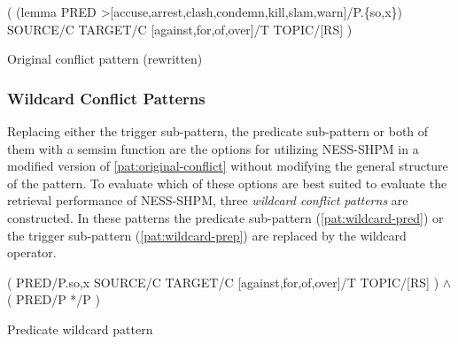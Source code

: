 \documentclass[11pt]{scrreprt}
\begin{document}
\begin{pattern}
  \normalfont\sffamily
  \centering
  ( (lemma PRED >[accuse,arrest,clash,condemn,kill,slam,warn]/P.\{so,x\}) \\
  SOURCE/C TARGET/C [against,for,of,over]/T TOPIC/[RS] ) 

  \caption{Original conflict pattern (rewritten)}
  \label{pat:original-conflict-rewritten}
\end{pattern}








\subsubsection{Wildcard Conflict Patterns}
\label{sec:wildcard-conflict-patterns}
Replacing either the trigger sub-pattern, the predicate sub-pattern or both of them with a semsim function are the options for utilizing NESS-SHPM in a modified version of \cref{pat:original-conflict} without modifying the general structure of the pattern. To evaluate which of these options are best suited to evaluate the retrieval performance of NESS-SHPM, three \textit{wildcard conflict patterns} are constructed. In these patterns the predicate sub-pattern (\cref{pat:wildcard-pred}) or the trigger sub-pattern (\cref{pat:wildcard-prep}) are replaced by the wildcard operator. 

\begin{pattern}
  \normalfont\sffamily
  \centering
  ( PRED/P.{so,x} SOURCE/C TARGET/C [against,for,of,over]/T TOPIC/[RS] ) \(\wedge\) \\ ( PRED/P */P )
  \caption{Predicate wildcard pattern}
  \label{pat:wildcard-pred}
\end{pattern}
\end{document}
